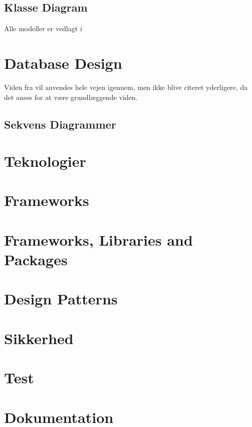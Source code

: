 \subsection{Klasse Diagram}
Alle modeller er vedlagt i 

\section{Database Design}
Viden fra \cite{connolly2023database} vil anvendes hele vejen igennem, men ikke blive citeret yderligere, da det anses for at være grundlæggende viden.

\subsection{Sekvens Diagrammer}

\section{Teknologier}

\section{Frameworks}

\section{Frameworks, Libraries and Packages}



\section{Design Patterns}

\section{Sikkerhed}

\section{Test}

\section{Dokumentation}